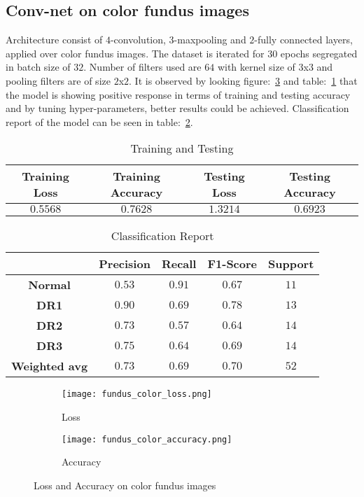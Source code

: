 \documentclass[12pt,a4paper,titlepage]{report}
\begin{document}
\subsection{Conv-net on color fundus images}
Architecture consist of $4$-convolution, $3$-maxpooling and $2$-fully connected layers, applied over color fundus images. The dataset is iterated for $30$ epochs segregated in batch size of $32$. Number of filters used are $64$ with kernel size of $3$x$3$ and pooling filters are of size $2$x$2$. It is observed by looking figure:~\ref{fig: Image2} and table:~\ref{tab: Table-4} that the model is showing positive response in terms of training and testing accuracy and by tuning hyper-parameters, better results could be achieved. Classification report of the model can be seen in table:~\ref{tab: Table-5}. \vspace{10pt}
\vspace{20pt}
\begin{table}[H]
\centering
\caption{Training and Testing}
\label{tab: Table-4}
\begin{tabular}{c c c c}
\hline
\textbf{Training Loss} & \textbf{Training Accuracy} & \textbf{Testing Loss} & \textbf{Testing Accuracy}\\
\hline
$0.5568$ & $0.7628$ & $1.3214$ & $0.6923$\\
\hline
\end{tabular}
\end{table}
\vspace{20pt}

\begin{table}[H]
\centering
\caption{Classification Report}
\label{tab: Table-5}
\begin{tabular}{c c c c c}
\hline
\textbf{} & \textbf{Precision} & \textbf{Recall} & \textbf{F1-Score} & \textbf{Support} \\
\hline
\textbf{Normal} & $0.53$ & $0.91$ & $0.67$ & $11$\\
\textbf{DR1} & $0.90$ & $0.69$ & $0.78$ & $13$\\
\textbf{DR2} & $0.73$ & $0.57$ & $0.64$ & $14$\\
\textbf{DR3} & $0.75$ & $0.64$ & $0.69$ & $14$\\
\textbf{Weighted avg} & $0.73$ & $0.69$ & $0.70$ & $52$\\
\hline
\end{tabular}
\end{table}

\begin{figure}[H]
\centering
\begin{subfigure}[h]{0.45\linewidth}
\texttt{[image: fundus\_color\_loss.png]}
\caption{Loss}
\label{fig:a}
\end{subfigure}
\quad
\begin{subfigure}[h]{0.45\linewidth}
\texttt{[image: fundus\_color\_accuracy.png]}
\caption{Accuracy}
\label{fig:b}
\end{subfigure}
\caption{Loss and Accuracy on color fundus images}
\label{fig: Image2}
\end{figure}
\end{document}
